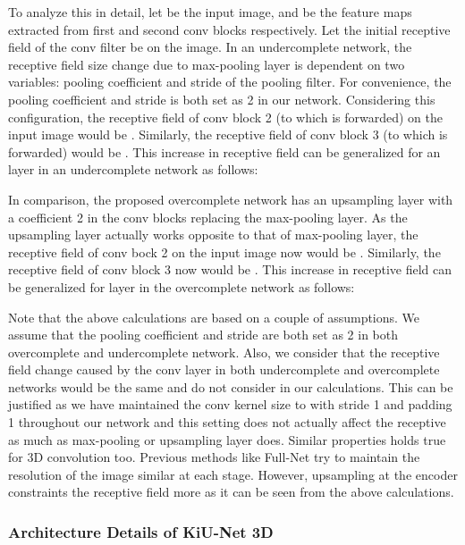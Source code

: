 \documentclass[journal,twoside,web]{ieeecolor}
\begin{document}
To analyze this in detail, let  be the input image,  and  be the feature maps extracted from first and second conv blocks respectively. Let the initial receptive field of the conv filter be  on the image. In an undercomplete network, the receptive field size change due to max-pooling layer is dependent on two variables: pooling coefficient and stride of the pooling filter. For convenience, the pooling coefficient and stride is both set as 2 in our network. Considering this configuration, the receptive field of conv block 2 (to which  is forwarded) on the input image would be . Similarly, the receptive field of conv block 3 (to which  is forwarded) would be . This increase in receptive field can be generalized for an  layer in an undercomplete network as follows:










In comparison, the proposed overcomplete network has an upsampling layer with a coefficient 2 in the conv blocks replacing the max-pooling layer. As the upsampling layer actually works  opposite to that of max-pooling layer, the receptive field of conv bock 2 on the input image now would be . Similarly, the receptive field of conv block 3  now would be . This increase in receptive field can be generalized for  layer in the overcomplete network as follows:  


Note that the above calculations are based on a couple of assumptions. We assume that the pooling coefficient and stride are both set as 2 in both overcomplete and undercomplete network. Also, we consider that the receptive field change caused by the conv layer in both undercomplete and overcomplete networks would be the same and do not consider in our calculations. This can be justified as we have maintained the conv kernel size to  with stride 1 and padding 1 throughout our network and this setting does not actually affect the receptive as much as max-pooling or upsampling layer does. Similar properties holds true for 3D convolution too. Previous methods like Full-Net try to maintain the resolution of the image similar at each stage. However, upsampling at the encoder constraints the receptive field more as it can be seen from the above calculations. 










\subsubsection{Architecture Details of KiU-Net 3D}
\end{document}

